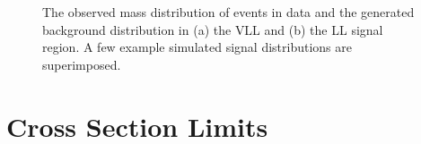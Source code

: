 \begin{figure}
\caption{The observed mass distribution of events in data and the generated background distribution in (a) the \ac{VLL} and (b) the \ac{LL} signal region. A few example simulated signal distributions are superimposed.}
\label{fig:signal_mass}
\end{figure}


\section{Cross Section Limits}

